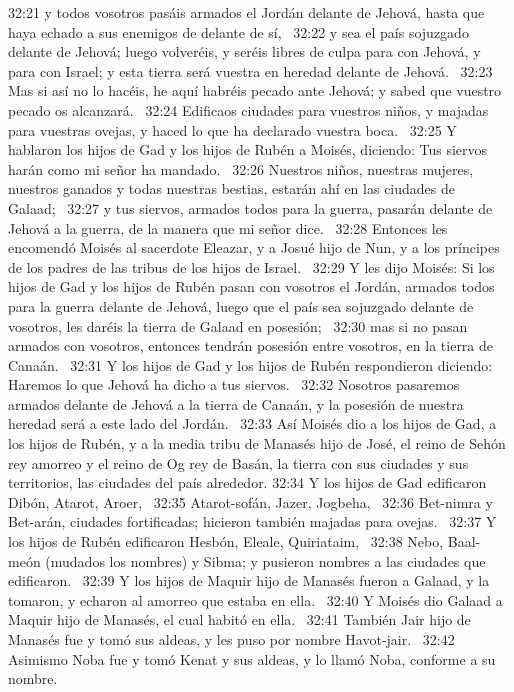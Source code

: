 32:21 y todos vosotros pasáis armados el Jordán delante de Jehová, hasta que haya echado a sus enemigos de delante de sí,  
32:22 y sea el país sojuzgado delante de Jehová; luego volveréis, y seréis libres de culpa para con Jehová, y para con Israel; y esta tierra será vuestra en heredad delante de Jehová.  
32:23 Mas si así no lo hacéis, he aquí habréis pecado ante Jehová; y sabed que vuestro pecado os alcanzará.  
32:24 Edificaos ciudades para vuestros niños, y majadas para vuestras ovejas, y haced lo que ha declarado vuestra boca.  
32:25 Y hablaron los hijos de Gad y los hijos de Rubén a Moisés, diciendo: Tus siervos harán como mi señor ha mandado.  
32:26 Nuestros niños, nuestras mujeres, nuestros ganados y todas nuestras bestias, estarán ahí en las ciudades de Galaad;  
32:27 y tus siervos, armados todos para la guerra, pasarán delante de Jehová a la guerra, de la manera que mi señor dice.  
32:28 Entonces les encomendó Moisés al sacerdote Eleazar, y a Josué hijo de Nun, y a los príncipes de los padres de las tribus de los hijos de Israel.  
32:29 Y les dijo Moisés: Si los hijos de Gad y los hijos de Rubén pasan con vosotros el Jordán, armados todos para la guerra delante de Jehová, luego que el país sea sojuzgado delante de vosotros, les daréis la tierra de Galaad en posesión;  
32:30 mas si no pasan armados con vosotros, entonces tendrán posesión entre vosotros, en la tierra de Canaán.  
32:31 Y los hijos de Gad y los hijos de Rubén respondieron diciendo: Haremos lo que Jehová ha dicho a tus siervos.  
32:32 Nosotros pasaremos armados delante de Jehová a la tierra de Canaán, y la posesión de nuestra heredad será a este lado del Jordán.  
32:33 Así Moisés dio a los hijos de Gad, a los hijos de Rubén, y a la media tribu de Manasés hijo de José, el reino de Sehón rey amorreo y el reino de Og rey de Basán, la tierra con sus ciudades y sus territorios, las ciudades del país alrededor. 
32:34 Y los hijos de Gad edificaron Dibón, Atarot, Aroer,  
32:35 Atarot-sofán, Jazer, Jogbeha,  
32:36 Bet-nimra y Bet-arán, ciudades fortificadas; hicieron también majadas para ovejas.  
32:37 Y los hijos de Rubén edificaron Hesbón, Eleale, Quiriataim,  
32:38 Nebo, Baal-meón (mudados los nombres) y Sibma; y pusieron nombres a las ciudades que edificaron.  
32:39 Y los hijos de Maquir hijo de Manasés fueron a Galaad, y la tomaron, y echaron al amorreo que estaba en ella.  
32:40 Y Moisés dio Galaad a Maquir hijo de Manasés, el cual habitó en ella.  
32:41 También Jair hijo de Manasés fue y tomó sus aldeas, y les puso por nombre Havot-jair.  
32:42 Asimismo Noba fue y tomó Kenat y sus aldeas, y lo llamó Noba, conforme a su nombre.  
